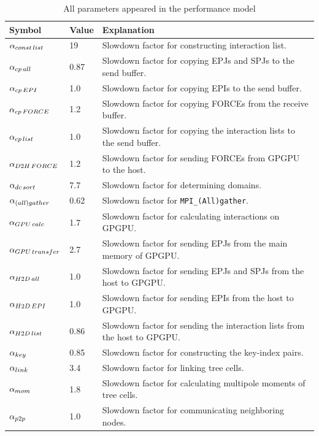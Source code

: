 \documentclass[dvipdfmx]{pasj01}
\begin{document}
\begin{longtable}{|l|l|l|}
  \caption{All parameters appeared in the performance model} \label{tab:params} \\ \hline
  Symbol & Value & Explanation \\ \hline
  \endfirsthead
  \endhead
  \endfoot
  \endlastfoot
  $\alpha_{\rm const\, list}$ & 19   & Slowdown factor for constructing interaction list. \\
  $\alpha_{\rm cp\, all}$    & 0.87  & Slowdown factor for copying EPJs and SPJs to the send buffer. \\
  $\alpha_{\rm cp\, EPI}$    & 1.0   & Slowdown factor for copying EPIs to the send buffer. \\
  $\alpha_{\rm cp\, FORCE}$  & 1.2   & Slowdown factor for copying FORCEs from the receive buffer. \\ 
  $\alpha_{\rm cp\, list}$   & 1.0   & Slowdown factor for copying the interaction lists to the send buffer. \\
  $\alpha_{\rm D2H\, FORCE}$  & 1.2  & Slowdown factor for sending FORCEs from GPGPU to the host. \\
  $\alpha_{\rm dc\, sort}$ & 7.7  & Slowdown factor for determining domains. \\
  $\alpha_{\rm (all)gather}$  & 0.62  & Slowdown factor for {\tt MPI\_(All)gather}. \\
  $\alpha_{\rm GPU\, calc}$  & 1.7   & Slowdown factor for calculating interactions on GPGPU. \\
  $\alpha_{\rm GPU\, transfer}$  & 2.7   & Slowdown factor for sending EPJs from the main memory of GPGPU. \\ 
  $\alpha_{\rm H2D\, all}$   & 1.0   & Slowdown factor for sending EPJs and SPJs from the host to GPGPU. \\
  $\alpha_{\rm H2D\, EPI}$   & 1.0   & Slowdown factor for sending EPIs from the host to GPGPU. \\
  $\alpha_{\rm H2D\, list}$  & 0.86  & Slowdown factor for sending the interaction lists from the host to GPGPU. \\
  $\alpha_{\rm key}$         & 0.85 & Slowdown factor for constructing the key-index pairs. \\
  $\alpha_{\rm link}$        & 3.4 & Slowdown factor for linking tree cells. \\
  $\alpha_{\rm mom}$  & 1.8  & Slowdown factor for calculating multipole moments of tree cells. \\
  $\alpha_{\rm p2p}$  & 1.0  & Slowdown factor for communicating neighboring nodes. \\

\end{longtable}
\end{document}
